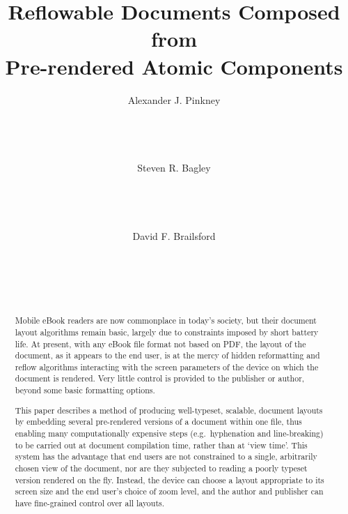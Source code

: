 \documentclass{sig-alternate}
\begin{document}
\title{Reflowable Documents Composed from\\Pre-rendered Atomic Components}

\author{
	\alignauthor Alexander J. Pinkney\\
	\\
	\\
	\\
	\\
	\alignauthor Steven R. Bagley\\
	\\
	\\
	\\
	\\
	\alignauthor David F. Brailsford\\
	\\
	\\
	\\
	\\
}

\maketitle


\begin{abstract}
Mobile eBook readers are now commonplace in today's society, but their document layout algorithms remain basic, largely due to constraints imposed by short battery life. At present, with any eBook file format not based on PDF, the layout of the document, as it appears to the end user, is at the mercy of hidden reformatting and reflow algorithms interacting with the screen parameters of the device on which the document is rendered. Very little control is provided to the publisher or author, beyond some basic formatting options.

This paper describes a method of producing well-typeset, scalable, document layouts by embedding several pre-rendered versions of a document within one file, thus enabling many computationally expensive steps (e.g.~hyphenation and line-breaking) to be carried out at document compilation time, rather than at `view time'. This system has the advantage that end users are not constrained to a single, arbitrarily chosen view of the document, nor are they subjected to reading a poorly typeset version rendered on the fly. Instead, the device can choose a layout appropriate to its screen size and the end user's choice of zoom level, and the author and publisher can have fine-grained control over all layouts.
\end{abstract}
\end{document}
